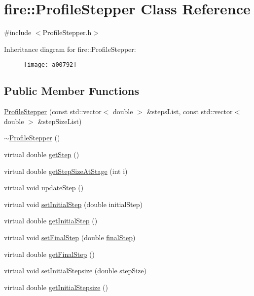 \hypertarget{a00792}{}\section{fire\+:\+:Profile\+Stepper Class Reference}
\label{a00792}


{\ttfamily \#include $<$Profile\+Stepper.\+h$>$}

Inheritance diagram for fire\+:\+:Profile\+Stepper\+:\begin{figure}[H]
\begin{center}
\leavevmode
\texttt{[image: a00792]}
\end{center}
\end{figure}
\subsection*{Public Member Functions}
\begin{DoxyCompactItemize}
\item 
\hyperlink{a00792_a5bba5babbcb293b5e6a535cc4d06c55f}{Profile\+Stepper} (const std\+::vector$<$ double $>$ \&steps\+List, const std\+::vector$<$ double $>$ \&step\+Size\+List)
\item 
\hyperlink{a00792_a6838143d952dec2519a43c576a1f1546}{$\sim$\+Profile\+Stepper} ()
\item 
virtual double \hyperlink{a00792_a9096ad65a3fcf63678b600cbe0c33961}{get\+Step} ()
\item 
virtual double \hyperlink{a00792_adaa1a23c068977ecc6809dd8eecab49d}{get\+Step\+Size\+At\+Stage} (int i)
\item 
virtual void \hyperlink{a00792_a2c13fd4da5550f1e58df2b54bbfe4c2c}{update\+Step} ()
\item 
virtual void \hyperlink{a00792_adf2f78648d9539282225117c0fd243af}{set\+Initial\+Step} (double initial\+Step)
\item 
virtual double \hyperlink{a00792_af24660fa4bd027f877d5c1bdeb286cf5}{get\+Initial\+Step} ()
\item 
virtual void \hyperlink{a00792_af8203296b4f3bef53bafab7cb654cc97}{set\+Final\+Step} (double \hyperlink{a00792_a4f2347f039417fe9cdd16d3ca74a072d}{final\+Step})
\item 
virtual double \hyperlink{a00792_ae6f257aca7b3bb62a851169a01bcaacf}{get\+Final\+Step} ()
\item 
virtual void \hyperlink{a00792_a55c44fd97d8b6a474243ad0da48b039d}{set\+Initial\+Stepsize} (double step\+Size)
\item 
virtual double \hyperlink{a00792_a86e7035366907a08a36722655746271e}{get\+Initial\+Stepsize} ()
\end{DoxyCompactItemize}
